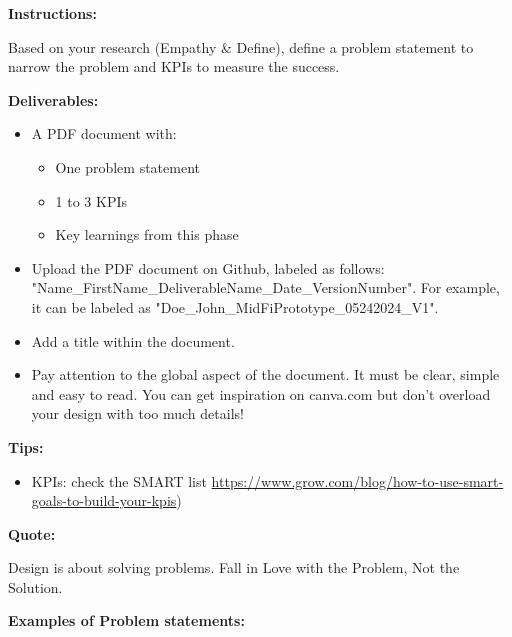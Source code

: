 \makeheaderfiles

\textbf{Instructions:}

Based on your research (Empathy \& Define), define a problem statement to narrow the problem and KPIs to measure the success.

\textbf{Deliverables:}

\begin{itemize}
\item A PDF document with:
\begin{itemize}
\item One problem statement
\item 1 to 3 KPIs
\item Key learnings from this phase
\end{itemize}
\item Upload the PDF document on Github, labeled as follows: "Name\_FirstName\_DeliverableName\_Date\_VersionNumber". For example, it can be labeled as "Doe\_John\_MidFiPrototype\_05242024\_V1".
\item Add a title within the document.
\item Pay attention to the global aspect of the document. It must be clear, simple and easy to read. You can get inspiration on canva.com but don't overload your design with too much details!
\end{itemize}

\textbf{Tips:}
\begin{itemize}
\item KPIs: check the SMART list \url{https://www.grow.com/blog/how-to-use-smart-goals-to-build-your-kpis}) 
\end{itemize}

\textbf{Quote:}

Design is about solving problems. Fall in Love with the Problem, Not the Solution.

\textbf{Examples of Problem statements:}

